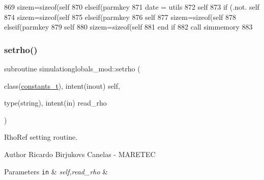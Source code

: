 \begin{DoxyCode}
869         sizem=sizeof(self%
870     \textcolor{keywordflow}{elseif}(parmkey%
871         date = utils%
872         self%
873         \textcolor{keywordflow}{if} (.not. self%
874         sizem=sizeof(self%
875     \textcolor{keywordflow}{elseif}(parmkey%
876         self%
877         sizem=sizeof(self%
878     \textcolor{keywordflow}{elseif}(parmkey%
879         self%
880         sizem=sizeof(self%
881 \textcolor{keywordflow}{    end if}
882     \textcolor{keyword}{call }simmemory%
883 
\end{DoxyCode}
\mbox{\label{namespacesimulationglobals__mod_a7d41fc05216d326ae8c0b090362430d3}} 
\subsubsection{\texorpdfstring{setrho()}{setrho()}}
{\footnotesize\ttfamily subroutine simulationglobals\+\_\+mod\+::setrho (\begin{DoxyParamCaption}\item[{class(\mbox{\hyperlink{structsimulationglobals__mod_1_1constants__t}{constants\+\_\+t}}), intent(inout)}]{self,  }\item[{type(string), intent(in)}]{read\+\_\+rho }\end{DoxyParamCaption})\hspace{0.3cm}{\ttfamily [private]}}



Rho\+Ref setting routine. 

\begin{DoxyAuthor}{Author}
Ricardo Birjukovs Canelas -\/ M\+A\+R\+E\+T\+EC 
\end{DoxyAuthor}

\begin{DoxyParams}[1]{Parameters}
\mbox{\tt in}  & {\em self,read\+\_\+rho} & \\
\hline
\end{DoxyParams}



